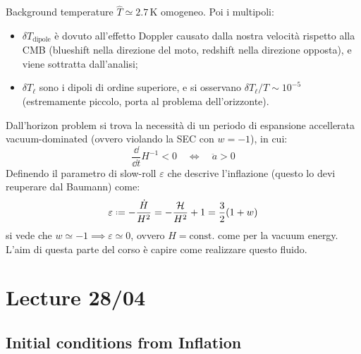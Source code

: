 Background temperature $ \hat{T} \simeq 2.7 \,\text{K} $ omogeneo. Poi i multipoli:
\begin{itemize}
  \item $ \delta T_\text{dipole} $ è dovuto all'effetto Doppler causato dalla nostra velocità rispetto alla CMB (blueshift nella direzione del moto, redshift nella direzione opposta), e viene sottratta dall'analisi;
  \item $ \delta T_\ell $ sono i dipoli di ordine superiore, e si osservano $ \delta T_\ell / T \sim 10^{-5} $ (estremamente piccolo, porta al problema dell'orizzonte).
\end{itemize}

Dall'horizon problem si trova la necessità di un periodo di espansione accellerata vacuum-dominated (ovvero violando la SEC con $ w = -1 $), in cui:
\begin{equation*}
  \frac{\dd}{\dd t} H^{-1} < 0
  \quad \iff \quad
  \ddot{a} > 0
\end{equation*}
Definendo il parametro di slow-roll $ \varepsilon $ che descrive l'inflazione (questo lo devi reuperare dal Baumann) come:
\begin{equation}
  \varepsilon \defeq - \frac{\dot{H}}{H^2} = - \frac{\hub}{H^2} + 1 = \frac{3}{2} (1 + w)
\end{equation}
si vede che $ w \simeq -1 \implies \varepsilon \simeq 0 $, ovvero $ H = \text{const.} $ come per la vacuum energy. L'aim di questa parte del corso è capire come realizzare questo fluido.

\chapter{Lecture 28/04}

\section{Initial conditions from Inflation}

